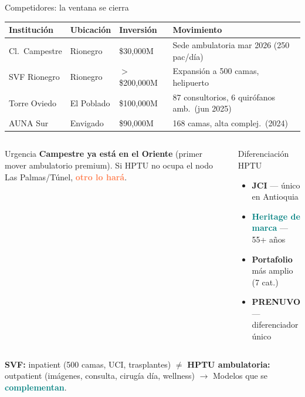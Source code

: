 \documentclass[aspectratio=169, 11pt]{beamer}
\newcommand{\highlight}[1]{\textcolor{teal}{\textbf{#1}}}
\newcommand{\danger}[1]{\textcolor{coral}{\textbf{#1}}}
\begin{document}
\begin{frame}{Competidores: la ventana se cierra}
\vspace{-4pt}
{\tiny\setlength{\tabcolsep}{3pt}
\begin{tabular}{@{}p{2.5cm}p{2cm}p{1.8cm}p{4.5cm}@{}}
\toprule
\textbf{Institución} & \textbf{Ubicación} & \textbf{Inversión} & \textbf{Movimiento} \\
\midrule
\rowcolor{coral!8}
Cl.\ Campestre & Rionegro & \$30,000M & Sede ambulatoria mar 2026 (250 pac/día) \\
SVF Rionegro & Rionegro & $>$\$200,000M & Expansión a 500 camas, helipuerto \\
\rowcolor{coral!8}
Torre Oviedo & El Poblado & \$100,000M & 87 consultorios, 6 quirófanos amb.\ (jun 2025) \\
AUNA Sur & Envigado & \$90,000M & 168 camas, alta complej.\ (2024) \\
\bottomrule
\end{tabular}
}

\vspace{3pt}
\begin{columns}[T]
\begin{alertblock}{\small Urgencia}
\scriptsize
\textbf{Campestre ya está en el Oriente} (primer mover ambulatorio premium). Si HPTU no ocupa el nodo Las Palmas/Túnel, \danger{otro lo hará}.
\end{alertblock}

\begin{exampleblock}{\small Diferenciación HPTU}
\scriptsize
\begin{itemize}\setlength{\itemsep}{0pt}
  \item \textbf{JCI} --- único en Antioquia
  \item \highlight{Heritage de marca} --- 55+ años
  \item \textbf{Portafolio} más amplio (7 cat.)
  \item \textbf{PRENUVO} --- diferenciador único
\end{itemize}
\end{exampleblock}
\end{columns}

\vspace{2pt}
{\tiny
\textbf{SVF:} inpatient (500 camas, UCI, trasplantes) $\neq$ \textbf{HPTU ambulatoria:} outpatient (imágenes, consulta, cirugía día, wellness) $\to$ Modelos que se \highlight{complementan}.}
\end{frame}
\end{document}
